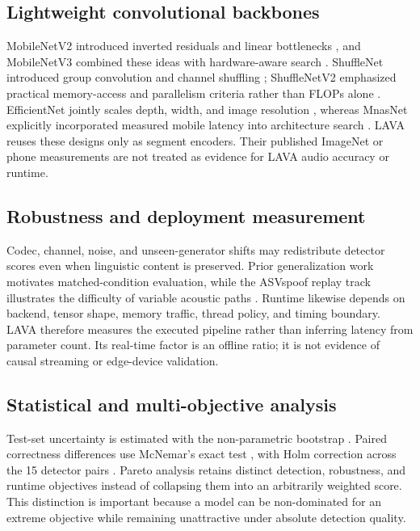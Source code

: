 \documentclass[10pt,journal,onecolumn]{IEEEtran}
\begin{document}
\subsection{Lightweight convolutional backbones}
MobileNetV2 introduced inverted residuals and linear bottlenecks \cite{sandler2018mobilenetv2}, and MobileNetV3 combined these ideas with hardware-aware search \cite{howard2019mobilenetv3}. ShuffleNet introduced group convolution and channel shuffling \cite{zhang2018shufflenet}; ShuffleNetV2 emphasized practical memory-access and parallelism criteria rather than FLOPs alone \cite{ma2018shufflenetv2}. EfficientNet jointly scales depth, width, and image resolution \cite{tan2019efficientnet}, whereas MnasNet explicitly incorporated measured mobile latency into architecture search \cite{tan2019mnasnet}. LAVA reuses these designs only as segment encoders. Their published ImageNet or phone measurements are not treated as evidence for LAVA audio accuracy or runtime.

\subsection{Robustness and deployment measurement}
Codec, channel, noise, and unseen-generator shifts may redistribute detector scores even when linguistic content is preserved. Prior generalization work \cite{muller2022generalize,kawa2022attack,muller2024harder,pascu2024calibrated,li2024crossdomain,das2025nonsemantic,ciobanu2026xmad} motivates matched-condition evaluation, while the ASVspoof replay track illustrates the difficulty of variable acoustic paths \cite{kinnunen2017asvspoof}. Runtime likewise depends on backend, tensor shape, memory traffic, thread policy, and timing boundary. LAVA therefore measures the executed pipeline rather than inferring latency from parameter count. Its real-time factor is an offline ratio; it is not evidence of causal streaming or edge-device validation.

\subsection{Statistical and multi-objective analysis}
Test-set uncertainty is estimated with the non-parametric bootstrap \cite{efron1979bootstrap}. Paired correctness differences use McNemar's exact test \cite{mcnemar1947}, with Holm correction across the 15 detector pairs \cite{holm1979}. Pareto analysis retains distinct detection, robustness, and runtime objectives instead of collapsing them into an arbitrarily weighted score. This distinction is important because a model can be non-dominated for an extreme objective while remaining unattractive under absolute detection quality.
\end{document}
